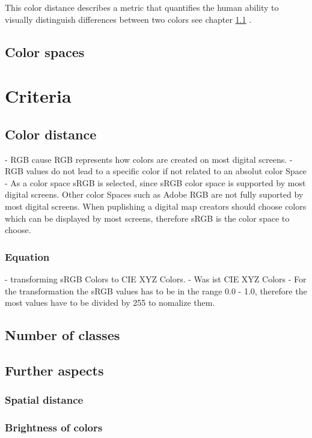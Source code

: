 This color distance describes a metric that quantifies the human ability to visually distinguish differences between two colors see chapter \ref{subsection:distance} \parencite{coltekin2017}.

\subsection{Color spaces}

\section{Criteria}

\subsection{Color distance}\label{subsection:distance}
- RGB cause RGB represents how colors are created on most digital screens. 
- RGB values do not lead to a specific color if not related to an absolut color Space
- As a color space sRGB is selected, since sRGB color space is supported by most digital screens. Other color Spaces such as Adobe RGB are not fully suported by most digital screens. When puplishing a digital map creators should choose colors which can be displayed by most screens, therefore sRGB is the color space to choose.
\subsubsection{Equation}

- transforming sRGB Colors to CIE XYZ Colors. 
- Was ist CIE XYZ Colors
- For the transformation the sRGB values has to be in the range 0.0 - 1.0, therefore the most values have to be divided by 255 to nomalize them. 
\subsection{Number of classes}

\subsection{Further aspects}

\subsubsection{Spatial distance}

\subsubsection{Brightness of colors}

